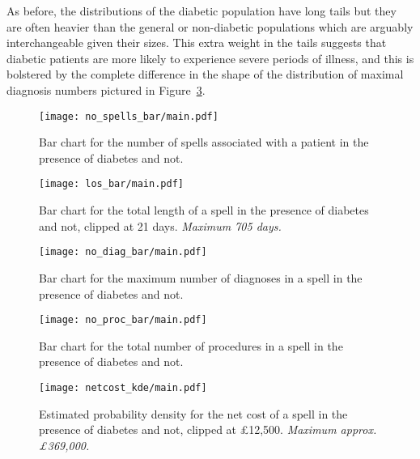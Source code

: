 As before, the distributions of the diabetic population have long tails but they
are often heavier than the general or non-diabetic populations which are
arguably interchangeable given their sizes. This extra weight in the tails
suggests that diabetic patients are more likely to experience severe periods of
illness, and this is bolstered by the complete difference in the shape of the
distribution of maximal diagnosis numbers pictured in
Figure~\ref{fig:diab_no_diag_bar}.

\begin{figure}[htbp]
    \centering
    \texttt{[image: no\_spells\_bar/main.pdf]}
    \caption{Bar chart for the number of spells associated with a patient in the
        presence of diabetes and not.}%
    \label{fig:diab_no_spells_bar}
\end{figure}

\begin{figure}[htbp]
    \texttt{[image: los\_bar/main.pdf]}
    \caption{Bar chart for the total length of a spell in the presence of
        diabetes and not, clipped at 21 days. \textit{Maximum 705 days.}}%
    \label{fig:diab_los_bar}
\end{figure}

\begin{figure}[htbp]
    \centering
    \texttt{[image: no\_diag\_bar/main.pdf]}
    \caption{Bar chart for the maximum number of diagnoses in a spell in the
        presence of diabetes and not.}%
    \label{fig:diab_no_diag_bar}
\end{figure}

\begin{figure}[htbp]
    \centering
    \texttt{[image: no\_proc\_bar/main.pdf]}
    \caption{Bar chart for the total number of procedures in a spell in the
        presence of diabetes and not.}%
    \label{fig:diab_no_proc_bar}
\end{figure}

\begin{figure}[htbp]
    \centering
    \texttt{[image: netcost\_kde/main.pdf]}
    \caption{Estimated probability density for the net cost of a spell in the
        presence of diabetes and not, clipped at \pounds12,500. \textit{Maximum
        approx. \pounds369,000.}}%
    \label{fig:diab_netcost_kde}
\end{figure}


